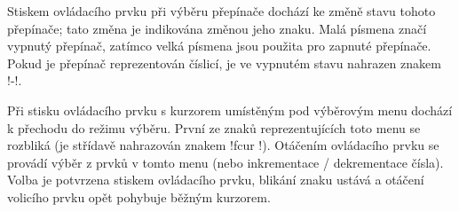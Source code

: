 Stiskem ovládacího prvku při výběru přepínače dochází ke změně stavu tohoto
přepínače; tato změna je indikována změnou jeho znaku. Malá písmena značí
vypnutý přepínač, zatímco velká písmena jsou použita pro zapnuté přepínače.
Pokud je přepínač reprezentován číslicí, je ve vypnutém stavu nahrazen znakem
!-!.

Při stisku ovládacího prvku s kurzorem umístěným pod výběrovým menu dochází
k přechodu do režimu výběru. První ze znaků reprezentujících toto menu se
rozbliká (je střídavě nahrazován znakem !{fcur} !). Otáčením
ovládacího prvku se provádí výběr z prvků v tomto menu (nebo inkrementace /
dekrementace čísla). Volba je potvrzena stiskem ovládacího prvku, blikání znaku
ustává a otáčení volicího prvku opět pohybuje běžným kurzorem.

\begingroup
